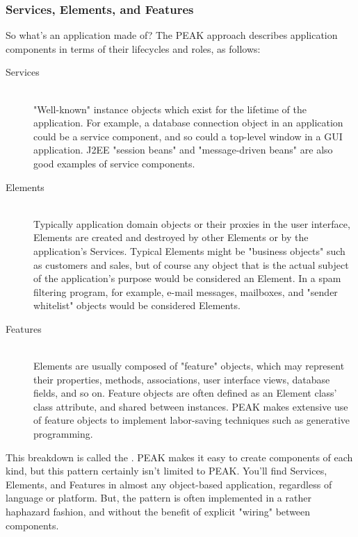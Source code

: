 \newpage









\subsubsection{Services, Elements, and Features}

So what's an application made of?  The PEAK approach describes application
components in terms of their lifecycles and roles, as follows:

\begin{description}

\item[Services] \hfill \\ 
"Well-known" instance objects which exist for the lifetime
of the application.  For example, a database connection object in an
application could be a service component, and so could a top-level window
in a GUI application.  J2EE "session beans" and "message-driven beans" are
also good examples of service components.

\item[Elements] \hfill \\ 
Typically application domain objects or their proxies in
the user interface, Elements are created and destroyed by other Elements or
by the application's Services.  Typical Elements might be "business objects"
such as customers and sales, but of course any object that is the actual
subject of the application's purpose would be considered an Element.  In a
spam filtering program, for example, e-mail messages, mailboxes, and
"sender whitelist" objects would be considered Elements.

\item[Features] \hfill \\
Elements are usually composed of "feature" objects, which
may represent their properties, methods, associations, user interface views,
database fields, and so on.  Feature objects are often defined as an Element
class' class attribute, and shared between instances.  PEAK makes extensive 
use of feature objects to implement labor-saving techniques such as generative
programming.

\end{description}

This breakdown is called the .
PEAK makes it easy to create components of each kind, but this pattern 
certainly isn't limited to PEAK.  You'll find Services, Elements, and Features
in almost any object-based application, regardless of language or platform.
But, the pattern is often implemented in a rather haphazard fashion, and
without the benefit of explicit "wiring" between components.


